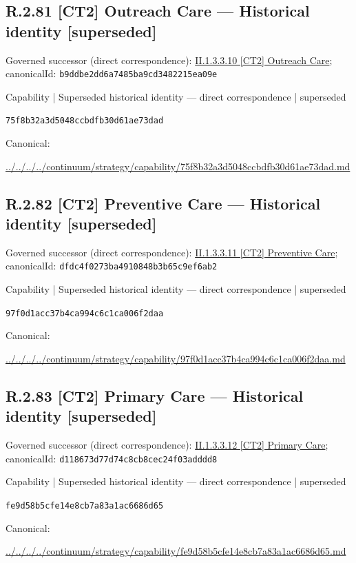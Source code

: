 \documentclass[10pt,a4paper]{article}
\begin{document}
\subsection*{R.2.81 [CT2] Outreach Care — Historical identity [superseded]}
Governed successor (direct correspondence): \hyperref[element-b9ddbe2dd6a7485ba9cd3482215ea09e]{II.1.3.3.10 [CT2] Outreach Care}; canonicalId: \texttt{b9ddbe2dd6a7485ba9cd3482215ea09e}\par
\label{element-75f8b32a3d5048ccbdfb30d61ae73dad}
{\small Capability | Superseded historical identity — direct correspondence | superseded}\par
\texttt{75f8b32a3d5048ccbdfb30d61ae73dad}\par
Canonical: \par
{\footnotesize\url{../../../../continuum/strategy/capability/75f8b32a3d5048ccbdfb30d61ae73dad.md}}\par
\subsection*{R.2.82 [CT2] Preventive Care — Historical identity [superseded]}
Governed successor (direct correspondence): \hyperref[element-dfdc4f0273ba4910848b3b65c9ef6ab2]{II.1.3.3.11 [CT2] Preventive Care}; canonicalId: \texttt{dfdc4f0273ba4910848b3b65c9ef6ab2}\par
\label{element-97f0d1acc37b4ca994c6c1ca006f2daa}
{\small Capability | Superseded historical identity — direct correspondence | superseded}\par
\texttt{97f0d1acc37b4ca994c6c1ca006f2daa}\par
Canonical: \par
{\footnotesize\url{../../../../continuum/strategy/capability/97f0d1acc37b4ca994c6c1ca006f2daa.md}}\par
\subsection*{R.2.83 [CT2] Primary Care — Historical identity [superseded]}
Governed successor (direct correspondence): \hyperref[element-d118673d77d74c8cb8cec24f03adddd8]{II.1.3.3.12 [CT2] Primary Care}; canonicalId: \texttt{d118673d77d74c8cb8cec24f03adddd8}\par
\label{element-fe9d58b5cfe14e8cb7a83a1ac6686d65}
{\small Capability | Superseded historical identity — direct correspondence | superseded}\par
\texttt{fe9d58b5cfe14e8cb7a83a1ac6686d65}\par
Canonical: \par
{\footnotesize\url{../../../../continuum/strategy/capability/fe9d58b5cfe14e8cb7a83a1ac6686d65.md}}\par
\end{document}
